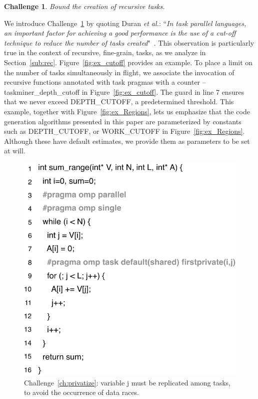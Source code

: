 \documentclass[sigplan,10pt,review,anonymous]{acmart}
\newtheorem{Challenge}{Challenge}[section]
\begin{document}
\begin{Challenge}
\label{ch:cutoff}
Bound the creation of recursive tasks.
\end{Challenge}

We introduce Challenge~\ref{ch:cutoff} by quoting Duran {\em et al.}:
``{\em In task parallel languages, an important factor for achieving a good
performance is the use of a cut-off technique to reduce the number of tasks
created}"~\cite{Duran08b}.
This observation is particularly true in the context of recursive, fine-grain,
tasks, as we analyze in Section~\ref{sub:rec}.
Figure~\ref{fig:ex_cutoff} provides an example.
To place a limit on the number of tasks simultaneously in flight, we associate
the invocation of recursive functions annotated with task pragmas with a
counter -- \textsf{taskminer\_depth\_cutoff} in Figure~\ref{fig:ex_cutoff}.
The guard in line 7 ensures that we never exceed \textsf{DEPTH\_CUTOFF}, a
predetermined threshold.
This example, together with Figure~\ref{fig:ex_Regions}, lets us emphasize that
the code generation algorithms presented in this paper are
parameterized by constants such as \textsf{DEPTH\_CUTOFF}, or
\textsf{WORK\_CUTOFF} in Figure~\ref{fig:ex_Regions}. Although these
have default estimates, we provide them as parameters to be set at will.

\begin{figure}[h!]
\begin{center}
\includegraphics[width=1\columnwidth]{images/ex_privatize}
\caption{Challenge~\ref{ch:privatize}: variable \textsf{j} must be replicated among
tasks, to avoid the occurrence of data races.}
\label{fig:ex_privatize}
\end{center}
\end{figure}
\end{document}
